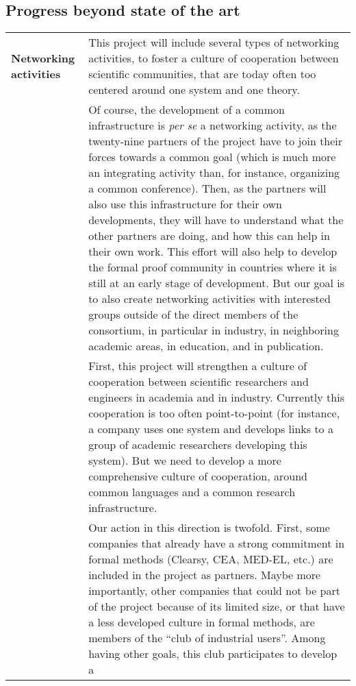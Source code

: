\subsection*{Progress beyond state of the art}

\begin{longtable}{|p{}|p{}|}
\hline
{\bf Networking activities}
&
This project will include several types of networking activities, to
foster a culture of cooperation between scientific communities, that
are today often too centered around one system and one theory.\\
&
\hspace{0.4cm} Of course, the development of a common infrastructure is
\emph{per se} a networking activity, as the twenty-nine partners of the
project have to join their forces towards a common goal (which is much
more an integrating activity than, for instance, organizing a common
conference). Then, as the partners will also use this infrastructure
for their own developments, they will have to understand what the
other partners are doing, and how this can help in their own work.
This effort will also help to develop the formal proof community in
countries where it is still at an early stage of development.
But our goal is to also create networking activities with interested
groups outside of the direct members of the consortium, in particular
in industry, in neighboring academic areas, in education, and in
publication.\\
&
\hspace{0.4cm}
First, this project will strengthen a culture of cooperation between scientific
researchers and engineers in academia and in industry. Currently this
cooperation is too often point-to-point (for instance, a company uses
one system and develops links to a group of academic researchers
developing this system). But we need to develop a more comprehensive
culture of cooperation, around common languages and a common research
infrastructure.\\
&
\hspace{0.4cm}
Our action in this direction is twofold. First, some companies that
already have a strong commitment in formal methods (Clearsy, CEA,
MED-EL, etc.) are included in the project as partners. Maybe more
importantly, other companies that could not be part of the project
because of its limited size, or that have a less developed
culture in formal methods, are members of the ``club of industrial
users''. Among having other goals, this club participates to develop a

\end{longtable}

